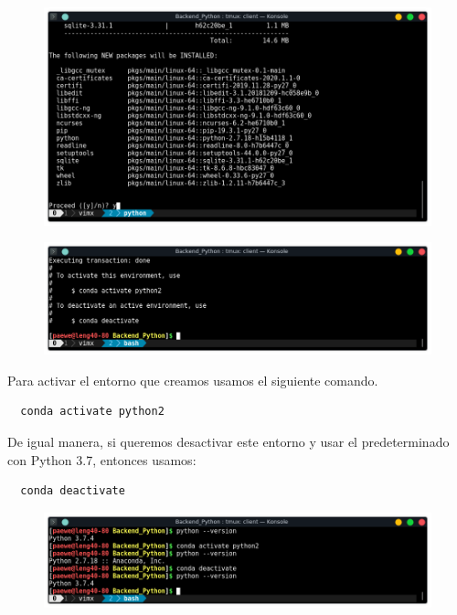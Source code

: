 \documentclass{article}
\begin{document}
\begin{figure}[h!]
  \centering
  \includegraphics[scale=0.75]{./Pictures/002_crear_env_python2.png}
\end{figure}

\newpage

\begin{figure}[h!]
  \centering
  \includegraphics[scale=0.75]{./Pictures/003_crear_env_python2.png}
\end{figure}

Para activar el entorno que creamos usamos el siguiente comando.

\begin{verbatim}
  conda activate python2
\end{verbatim}

De igual manera, si queremos desactivar este entorno y usar el predeterminado
con Python 3.7, entonces usamos:

\begin{verbatim}
  conda deactivate
\end{verbatim}


\begin{figure}[h!]
  \centering
  \includegraphics[scale=0.75]{./Pictures/004_activar_python2_desactivar.png}
\end{figure}
\end{document}

